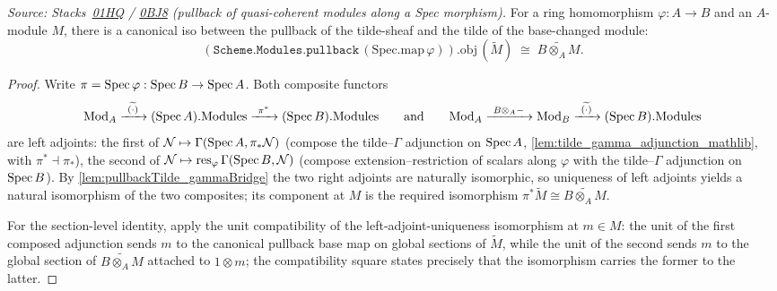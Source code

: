 \begin{lemma}
  \label{lem:pullback_tildeIso}
  \leanok
  \textit{Source: Stacks~\href{https://stacks.math.columbia.edu/tag/01HQ}{01HQ}
  / \href{https://stacks.math.columbia.edu/tag/0BJ8}{0BJ8} (pullback of
  quasi-coherent modules along a Spec morphism).}
  For a ring homomorphism \(\varphi : A \to B\) and an \(A\)-module
  \(M\), there is a canonical iso between the pullback of the
  tilde-sheaf and the tilde of the base-changed module:
  \[
    (\mathtt{Scheme.Modules.pullback}\, (\mathrm{Spec.map}\, \varphi)).\mathrm{obj}\,
      (\widetilde{M})
    \;\cong\;
    \widetilde{B \otimes_A M}.
  \]
\end{lemma}
\begin{proof}
  \leanok
  Write \(\pi = \operatorname{Spec}\varphi : \operatorname{Spec} B \to \operatorname{Spec} A\). Both composite
  functors
  \[
    \mathrm{Mod}_{A} \xrightarrow{\ \widetilde{(\cdot)}\ }
      (\Spec A).\mathrm{Modules} \xrightarrow{\ \pi^{*}\ }
      (\Spec B).\mathrm{Modules}
    \qquad\text{and}\qquad
    \mathrm{Mod}_{A} \xrightarrow{\ B \otimes_A -\ } \mathrm{Mod}_{B}
      \xrightarrow{\ \widetilde{(\cdot)}\ } (\Spec B).\mathrm{Modules}
  \]
  are left adjoints: the first of
  \(\mathcal N \mapsto \Gamma(\operatorname{Spec} A, \pi_{*}\mathcal N)\) (compose the
  tilde--\(\Gamma\) adjunction on \(\operatorname{Spec} A\),
  \cref{lem:tilde_gamma_adjunction_mathlib}, with
  \(\pi^{*} \dashv \pi_{*}\)), the second of
  \(\mathcal N \mapsto \mathrm{res}_{\varphi}\,\Gamma(\operatorname{Spec} B, \mathcal N)\)
  (compose extension--restriction of scalars along \(\varphi\) with the
  tilde--\(\Gamma\) adjunction on \(\operatorname{Spec} B\)). By
  \cref{lem:pullbackTilde_gammaBridge} the two right adjoints are
  naturally isomorphic, so uniqueness of left adjoints yields a natural
  isomorphism of the two composites; its component at \(M\) is the
  required isomorphism
  \(\pi^{*}\widetilde M \cong \widetilde{B \otimes_A M}\).

  For the section-level identity, apply the unit compatibility of the
  left-adjoint-uniqueness isomorphism at \(m \in M\): the unit of the
  first composed adjunction sends \(m\) to the canonical pullback base map
  on global sections of \(\widetilde M\), while the unit
  of the second sends \(m\) to the global section of
  \(\widetilde{B \otimes_A M}\) attached to \(1 \otimes m\); the
  compatibility square states precisely that the isomorphism carries
  the former to the latter.
\end{proof}

